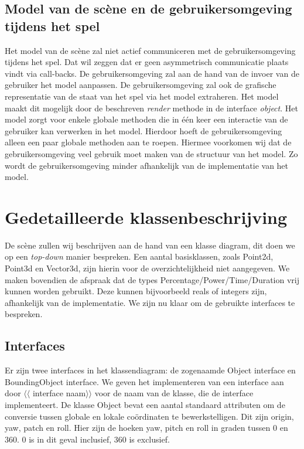 \documentclass[a4paper,11pt]{article}
\begin{document}
    \subsection{Model van de sc\`ene en de gebruikersomgeving tijdens het spel}
    Het model van de sc\`ene zal niet actief communiceren met de gebruikersomgeving tijdens het spel. Dat wil zeggen dat er geen asymmetrisch communicatie plaats vindt via call-backs. De gebruikersomgeving zal aan de hand van de invoer van de gebruiker het model aanpassen. De gebruikersomgeving zal ook de grafische representatie van de staat van het spel via het model extraheren. Het model maakt dit mogelijk door de beschreven \emph{render} methode in de interface \emph{object}. Het model zorgt voor enkele globale methoden die in \'e\'en keer een interactie van de gebruiker kan verwerken in het model. Hierdoor hoeft de gebruikersomgeving alleen een paar globale methoden aan te roepen. Hiermee voorkomen wij dat de gebruikersomgeving veel gebruik moet maken van de structuur van het model. Zo wordt de gebruikersomgeving minder afhankelijk van de implementatie van het model.
    
    \section{Gedetailleerde klassenbeschrijving}
    De sc\`ene zullen wij beschrijven aan de hand van een klasse diagram, dit doen we op een \emph{top-down} manier bespreken. Een aantal basisklassen, zoals Point2d, Point3d en Vector3d, zijn hierin voor de overzichtelijkheid niet aangegeven. We maken bovendien de afspraak dat de types Percentage/Power/Time/Duration vrij kunnen worden gebruikt. Deze kunnen bijvoorbeeld reals of integers zijn, afhankelijk van de implementatie.  We zijn nu klaar om de gebruikte interfaces te bespreken.

\subsection{Interfaces}
Er zijn twee interfaces in het klassendiagram: de zogenaamde Object interface en BoundingObject interface. We geven het implementeren van een interface aan door $\langle\langle$ interface naam$\rangle \rangle$ voor de naam van de klasse, die de interface implementeert.  De klasse Object bevat een aantal standaard attributen om de conversie tussen globale en lokale co\"ordinaten te bewerkstelligen. Dit zijn origin, yaw, patch en roll. Hier zijn de hoeken yaw, pitch en roll in graden tussen 0 en 360. 0 is in dit geval inclusief, 360 is exclusief.
\end{document}
